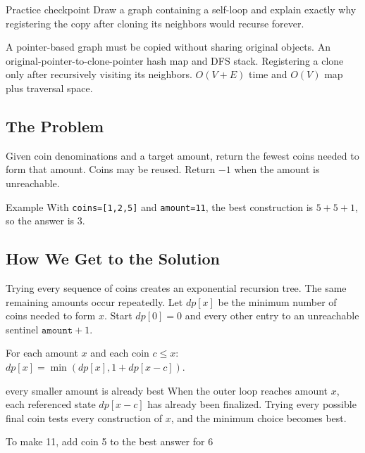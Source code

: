 \begin{revisionbox}{Practice checkpoint}
Draw a graph containing a self-loop and explain exactly why registering the
copy after cloning its neighbors would recurse forever.
\end{revisionbox}
\chaptercheckpoint
  {A pointer-based graph must be copied without sharing original objects.}
  {An original-pointer-to-clone-pointer hash map and DFS stack.}
  {Registering a clone only after recursively visiting its neighbors.}
  {$O(V+E)$ time and $O(V)$ map plus traversal space.}
\judgeclassnote



\subsection{The Problem}
Given coin denominations and a target amount, return the fewest coins needed
to form that amount. Coins may be reused. Return \(-1\) when the amount is
unreachable.

\begin{conceptbox}{Example}
With \texttt{coins=[1,2,5]} and \texttt{amount=11}, the best construction is
\(5+5+1\), so the answer is \(3\).
\end{conceptbox}

\subsection{How We Get to the Solution}
Trying every sequence of coins creates an exponential recursion tree. The same
remaining amounts occur repeatedly. Let \(dp[x]\) be the minimum number of
coins needed to form \(x\). Start \(dp[0]=0\) and every other entry to an
unreachable sentinel \(\texttt{amount}+1\).

For each amount \(x\) and each coin \(c\le x\): \(dp[x]=\min(dp[x],1+dp[x-c]).\)

\begin{invariantbox}{every smaller amount is already best}
When the outer loop reaches amount \(x\), each referenced state \(dp[x-c]\)
has already been finalized. Trying every possible final coin tests
every construction of \(x\), and the minimum choice becomes best.
\end{invariantbox}

\begin{visualbox}{To make 11, add coin 5 to the best answer for 6}
\centering
{}
\end{visualbox}

